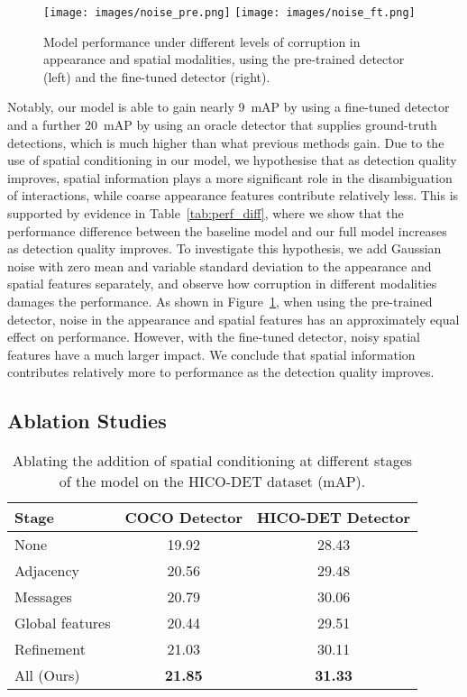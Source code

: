 \documentclass[10pt,twocolumn,letterpaper]{article}
\begin{document}
\begin{figure}[!t]\centering
	\texttt{[image: images/noise\_pre.png]}
	\texttt{[image: images/noise\_ft.png]}
	\caption{Model performance under different levels of corruption in appearance and spatial modalities, using the pre-trained detector (left) and the fine-tuned detector (right).}
	\label{fig:corruption}
\end{figure}

Notably, our model is able to gain nearly 9~mAP by using a fine-tuned detector and a further 20~mAP by using an oracle detector that supplies ground-truth detections, which is much higher than what previous methods gain. Due to the use of spatial conditioning in our model, we hypothesise that as detection quality improves, spatial information plays a more significant role in the disambiguation of interactions, while coarse appearance features contribute relatively less. This is supported by evidence in Table~\ref{tab:perf_diff}, where we show that the performance difference between the baseline model and our full model increases as detection quality improves. To investigate this hypothesis, we add Gaussian noise with zero mean and variable standard deviation to the appearance and spatial features separately, and observe how corruption in different modalities damages the performance. As shown in Figure~\ref{fig:corruption}, when using the pre-trained detector, noise in the appearance and spatial features has an approximately equal effect on performance. However, with the fine-tuned detector, noisy spatial features have a much larger impact. We conclude that spatial information contributes relatively more to performance as the detection quality improves.

\subsection{Ablation Studies}
\label{sec:ablation}

\begin{table}[t]\small
   \caption{Ablating the addition of spatial conditioning at different stages of the model on the HICO-DET dataset (mAP).}
   \label{tab:fusion}
\setlength{\tabcolsep}{4pt} \begin{tabularx}{\linewidth}{l C c}
		\toprule
      \textbf{Stage} & \textbf{COCO Detector} & \textbf{HICO-DET Detector} \\
      \midrule
		None & 19.92 & 28.43 \\
		Adjacency & 20.56 & 29.48 \\
		Messages & 20.79 & 30.06 \\
		Global features & 20.44 & 29.51 \\
		Refinement & 21.03 & 30.11 \\
		All (Ours) & \textbf{21.85} & \textbf{31.33}\\
		\bottomrule
   \end{tabularx}
\end{table}
\end{document}
